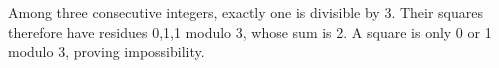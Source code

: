 Among three consecutive integers, exactly one is divisible by 3. Their squares therefore have residues 0,1,1 modulo 3, whose sum is 2. A square is only 0 or 1 modulo 3, proving impossibility.
